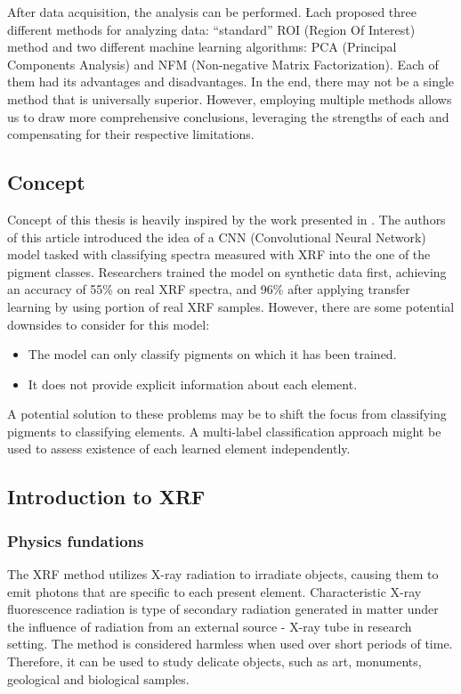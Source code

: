 After data acquisition, the analysis can be performed. 
Łach proposed three different methods for analyzing data: ``standard'' ROI (Region Of Interest) method and two different machine learning algorithms: PCA (Principal Components Analysis) and NFM (Non-negative Matrix Factorization). 
Each of them had its advantages and disadvantages. 
In the end, there may not be a single method that is universally superior. 
However, employing multiple methods allows us to draw more comprehensive conclusions, leveraging the strengths of each and compensating for their respective limitations.

\subsection{Concept}
Concept of this thesis is heavily inspired by the work presented in \cite{Jones2022}. 
The authors of this article introduced the idea of a CNN (Convolutional Neural Network) model tasked with classifying spectra measured with XRF into the one of the pigment classes. 
Researchers trained the model on synthetic data first, achieving an accuracy of 55\% on real XRF spectra, and 96\% after applying transfer learning by using portion of real XRF samples.  
However, there are some potential downsides to consider for this model:
\begin{itemize}
    \item The model can only classify pigments on which it has been trained.
    \item It does not provide explicit information about each element. 
\end{itemize}
A potential solution to these problems may be to shift the focus from classifying pigments to classifying elements. A multi-label classification approach might be used to assess existence of each learned element independently. 

\subsection{Introduction to XRF}
\subsubsection{Physics fundations}
The XRF method utilizes X-ray radiation to irradiate objects, causing them to emit photons that are specific to each present element.
Characteristic X-ray fluorescence radiation is type of secondary radiation generated in matter under the influence of radiation from an external source - X-ray tube in research setting.
The method is considered harmless when used over short periods of time.  
Therefore, it can be used to study delicate objects, such as art, monuments, geological and biological samples.

